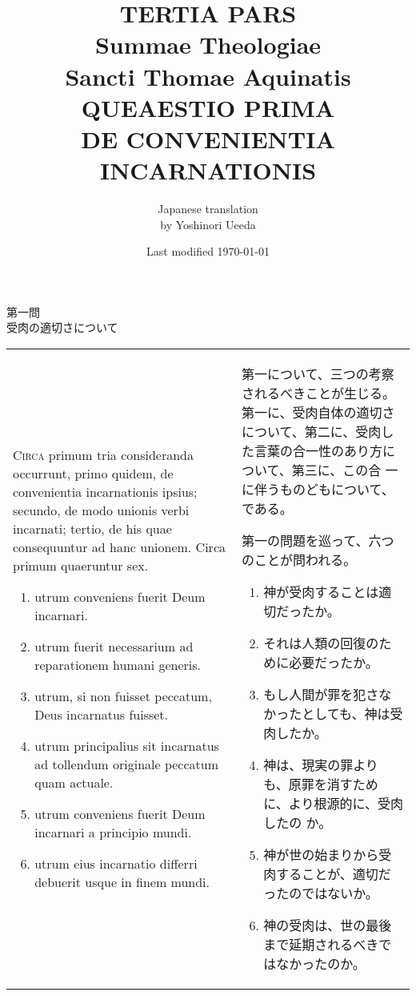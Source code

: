 \documentclass[10pt]{jsarticle} %
\title{{\bf TERTIA PARS}\\{\HUGE Summae Theologiae}\\Sancti Thomae
Aquinatis\\{\sffamily QUEAESTIO PRIMA}\\DE CONVENIENTIA INCARNATIONIS}
\author{Japanese translation\\by Yoshinori {\sc Ueeda}}
\date{Last modified \today}
\begin{document}
\maketitle
\pagestyle{fancy}

\begin{center}
{\Large 第一問\\受肉の適切さについて}
\end{center}



\begin{longtable}{p{21em}p{21em}}

{\Huge C}{\scshape irca} primum tria consideranda occurrunt, primo quidem, de convenientia
incarnationis ipsius; secundo, de modo unionis verbi incarnati; tertio,
de his quae consequuntur ad hanc unionem. Circa primum quaeruntur
sex. 

\begin{enumerate}
 \item utrum conveniens fuerit Deum incarnari.
 \item utrum fuerit necessarium ad reparationem humani generis.
 \item utrum, si non fuisset peccatum, Deus incarnatus fuisset.
 \item utrum principalius sit incarnatus ad tollendum originale peccatum
       quam actuale.
 \item utrum conveniens fuerit Deum incarnari a principio mundi.
 \item utrum
eius incarnatio differri debuerit usque in finem mundi.
\end{enumerate}

&

第一について、三つの考察されるべきことが生じる。第一に、受肉自体の適切さ
 について、第二に、受肉した言葉の合一性のあり方について、第三に、この合
 一に伴うものどもについて、である。

第一の問題を巡って、六つのことが問われる。
\begin{enumerate}
 \item 神が受肉することは適切だったか。
 \item それは人類の回復のために必要だったか。
 \item もし人間が罪を犯さなかったとしても、神は受肉したか。
 \item 神は、現実の罪よりも、原罪を消すために、より根源的に、受肉したの
       か。
 \item 神が世の始まりから受肉することが、適切だったのではないか。
 \item 神の受肉は、世の最後まで延期されるべきではなかったのか。
\end{enumerate}
\end{longtable}
\end{document}
